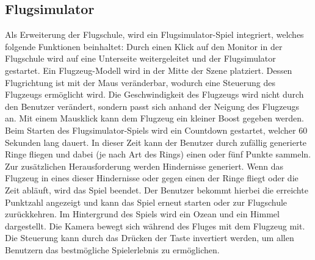 \subsection{Flugsimulator}
Als Erweiterung der Flugschule, wird ein Flugsimulator-Spiel integriert, welches folgende Funktionen beinhaltet:
\newparagraph
Durch einen Klick auf den Monitor in der Flugschule wird auf eine Unterseite weitergeleitet und der Flugsimulator gestartet.
Ein Flugzeug-Modell wird in der Mitte der Szene platziert.
Dessen Flugrichtung ist mit der Maus veränderbar, wodurch eine Steuerung des Flugzeugs ermöglicht wird.
Die Geschwindigkeit des Flugzeugs wird nicht durch den Benutzer verändert, sondern passt sich anhand der Neigung des Flugzeugs an.
Mit einem Mausklick kann dem Flugzeug ein kleiner Boost gegeben werden.
\newparagraph
Beim Starten des Flugsimulator-Spiels wird ein Countdown gestartet, welcher 60 Sekunden lang dauert.
In dieser Zeit kann der Benutzer durch zufällig generierte Ringe fliegen und dabei (je nach Art des Rings) einen oder fünf Punkte sammeln.
Zur zusätzlichen Herausforderung werden Hindernisse generiert.
Wenn das Flugzeug in eines dieser Hindernisse oder gegen einen der Ringe fliegt oder die Zeit abläuft, wird das Spiel beendet.
Der Benutzer bekommt hierbei die erreichte Punktzahl angezeigt und kann das Spiel erneut starten oder zur Flugschule zurückkehren.
\newparagraph
Im Hintergrund des Spiels wird ein Ozean und ein Himmel dargestellt.
Die Kamera bewegt sich während des Fluges mit dem Flugzeug mit.
Die Steuerung kann durch das Drücken der Taste  invertiert werden, um allen Benutzern das bestmögliche Spielerlebnis zu ermöglichen.